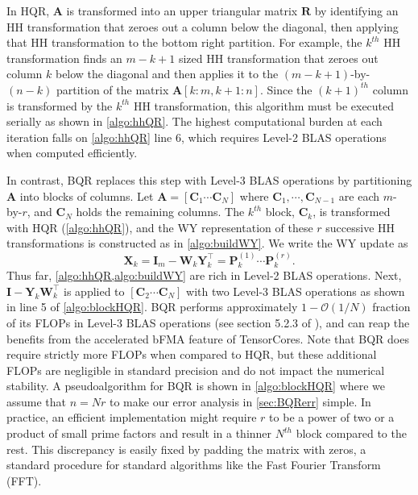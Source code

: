 \documentclass[review,onefignum,onetabnum]{siamart190516}
\newcommand{\bb}[1]{\mathbf{#1}}
\newcommand{\cO}{\mathcal{O}}
\begin{document}
In HQR, $\bb{A}$ is transformed into an upper triangular matrix $\bb{R}$ by identifying an HH transformation that zeroes out a column below the diagonal, then applying that HH transformation to the bottom right partition. 
For example, the $k^{th}$ HH transformation finds an $m-k+1$ sized HH transformation that zeroes out column $k$ below the diagonal and then applies it to the $(m-k+1)$-by-$(n-k)$ partition of the matrix $\bb{A}[k:m,k+1:n]$.
Since the $(k+1)^{th}$ column is transformed by the $k^{th}$ HH transformation, this algorithm must be executed serially as shown in \cref{algo:hhQR}.
The highest computational burden at each iteration falls on \cref{algo:hhQR} line 6, which requires Level-2 BLAS operations when computed efficiently. \par

In contrast, BQR replaces this step with Level-3 BLAS operations by partitioning $\bb{A}$ into blocks of columns.
Let $\bb{A} = [\bb{C}_1 \cdots  \bb{C}_N]$ where $\bb{C}_1,\cdots,\bb{C}_{N-1}$ are each $m$-by-$r$, and $\bb{C}_N$ holds the remaining columns.
The $k^{th}$ block, $\bb{C}_k$, is transformed with HQR (\cref{algo:hhQR}), and the WY representation of these $r$ successive HH transformations is constructed as in \cref{algo:buildWY}.
We write the WY update as
\begin{equation}
	\bb{X}_k = \bb{I}_m -\bb{W}_{k}\bb{Y}_{k}^{\top} = \bb{P}_k^{(1)}\cdots\bb{P}_{k}^{(r)}.
\end{equation}
Thus far, \cref{algo:hhQR,algo:buildWY} are rich in Level-2 BLAS operations.
Next, $\bb{I} -\bb{Y}_{k}\bb{W}_{k}^{\top}$ is applied to $[\bb{C}_2 \cdots  \bb{C}_N]$ with two Level-3 BLAS operations as shown in line 5 of \cref{algo:blockHQR}.
BQR performs approximately $1-\cO(1/N)$ fraction of its FLOPs in Level-3 BLAS operations (see section 5.2.3 of \cite{golub2013matrix}), and can reap the benefits from the accelerated bFMA feature of TensorCores. 
Note that BQR does require strictly more FLOPs when compared to HQR, but these additional FLOPs are negligible in standard precision and do not impact the numerical stability.
A pseudoalgorithm for BQR is shown in \cref{algo:blockHQR} where we assume that $n=Nr$ to make our error analysis in \cref{sec:BQRerr} simple.
In practice, an efficient implementation might require $r$ to be a power of two or a product of small prime factors and result in a thinner $N^{th}$ block compared to the rest. 
This discrepancy is easily fixed by padding the matrix with zeros, a standard procedure for standard algorithms like the Fast Fourier Transform (FFT).
\end{document}
